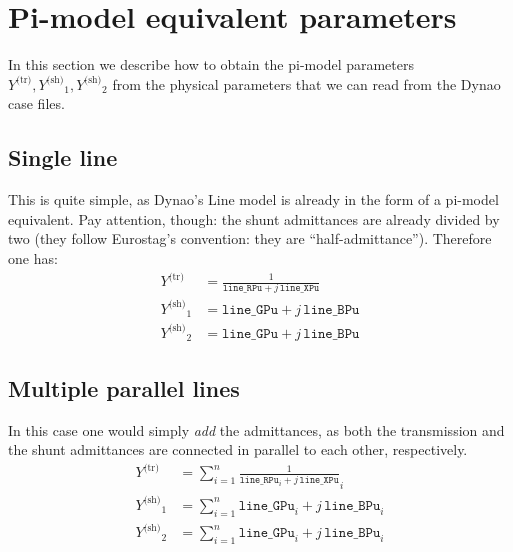\documentclass[a4paper,11pt]{article}
\newcommand{\code}[1]{\texttt{#1}}  %
\newcommand{\Dynawo}{Dyna\textomega o} %
\newcommand{\Ytr}{\ensuremath{Y^{\textrm{(tr)}}}}
\newcommand{\Ysh}{\ensuremath{Y^{\textrm{(sh)}}}}
\begin{document}
\newpage
\appendix
\appendixpage
\addappheadtotoc

\section{Pi-model equivalent parameters}

In this section we describe how to obtain the pi-model parameters $\Ytr, \Ysh_1,
\Ysh_2$ from the physical parameters that we can read from the \Dynawo{} case
files.


\subsection{Single line}

This is quite simple, as \Dynawo's Line model is already in the form of a
pi-model equivalent. Pay attention, though: the shunt admittances are already
divided by two (they follow Eurostag's convention: they are
``half-admittance'').  Therefore one has:
\begin{equation}
  \begin{split}
    \Ytr   & = \frac{1}{\code{line\_RPu} + j \, \code{line\_XPu}} \\
    \Ysh_1 & = \code{line\_GPu} + j \, \code{line\_BPu} \\
    \Ysh_2 & = \code{line\_GPu} + j \, \code{line\_BPu} 
  \end{split}
\end{equation}


\subsection{Multiple parallel lines}

In this case one would simply \emph{add} the admittances, as both the transmission and
the shunt admittances are connected in parallel to each other, respectively.
\begin{equation}
  \begin{split}
    \Ytr   & = \sum_{i=1}^n \frac{1}{\code{line\_RPu}_i + j \, \code{line\_XPu}}_i \\
    \Ysh_1 & = \sum_{i=1}^n \code{line\_GPu}_i + j \, \code{line\_BPu}_i \\
    \Ysh_2 & = \sum_{i=1}^n \code{line\_GPu}_i + j \, \code{line\_BPu}_i 
  \end{split}
\end{equation}
\end{document}
